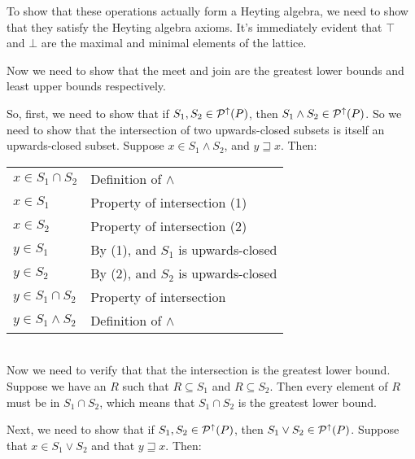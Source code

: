 To show that these operations actually form a Heyting algebra, we need
to show that they satisfy the Heyting algebra axioms. It's immediately
evident that $\top$ and $\bot$ are the maximal and minimal elements of
the lattice. 

Now we need to show that the meet and join are the greatest lower
bounds and least upper bounds respectively.

So, first, we need to show that if $S_1, S_2 \in \mathcal{P}^{\uparrow}({P})$, 
then $S_1 \land S_2 \in \mathcal{P}^{\uparrow}({P})$. So we need to show that
the intersection of two upwards-closed subsets is itself an upwards-closed
subset. Suppose $x \in S_1 \land S_2$, and $y \sqsupseteq x$. Then:
\\

\begin{tabular}{ll}
$x \in S_1 \cap S_2$          & Definition of $\land$ \\
$x \in S_1$                   & Property of intersection (1) \\
$x \in S_2$                   & Property of intersection (2) \\
$y \in S_1$                   & By (1), and $S_1$ is upwards-closed \\
$y \in S_2$                   & By (2), and $S_2$ is upwards-closed \\
$y \in S_1 \cap S_2$          & Property of intersection \\
$y \in S_1 \land S_2$         & Definition of $\land$ \\
\end{tabular}
\\

Now we need to verify that that the intersection is the greatest lower
bound. Suppose we have an $R$ such that $R \subseteq S_1$ and $R
\subseteq S_2$. Then every element of $R$ must be in $S_1 \cap S_2$, which
means that $S_1 \cap S_2$ is the greatest lower bound. 

Next, we need to show that if $S_1, S_2 \in \mathcal{P}^{\uparrow}({P})$, 
then $S_1 \vee S_2 \in \mathcal{P}^{\uparrow}({P})$. Suppose that 
$x \in S_1 \vee S_2$ and that $y \sqsupseteq x$. Then:
\\

